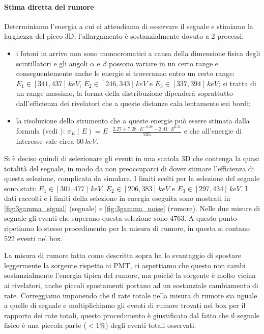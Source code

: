 \paragraph{Stima diretta del rumore}
Determiniamo l'energia a cui ci attendiamo di osservare il segnale e stimiamo la larghezza del picco 3D, l'allargamento è sostanzialmente dovuto a 2 processi:
\begin{itemize}
	\item i fotoni in arrivo non sono monocromatici a causa della dimensione fisica degli scintillatori e gli angoli $\alpha$ e $\beta$ possono variare in un certo range e conseguentemente anche le energie si troveranno entro un certo range:  $E_1 \in [341,437]\,\si{keV}$, $E_2 \in [246,343]\,\si{keV}$ e $E_3 \in [337,394]\,\si{keV}$; si tratta di un range massimo, la forma della distribuzione dipenderà soprattutto dall'efficienza dei rivelatori che a queste distanze cala lentamente sui bordi;
	\item la risoluzione dello strumento che a queste energie può essere stimata dalla formula (vedi \cite{3}):
	$\sigma_E(E) = E \cdot \frac{2.27 + 7.28 \cdot E ^ {-0.29} - 2.41 \cdot E ^ {0.21}} {235}$ e che all'energie di interesse vale circa $\SI{60}{keV}$.
\end{itemize}

Si è deciso quindi di selezionare gli eventi in una scatola 3D che contenga la quasi totalità del segnale, in modo da non preoccuparci di dover stimare l'efficienza di questa selezione, complicata da simulare. 
I limiti scelti per la selezione del segnale sono stati: $E_1 \in [301,477]\,\si{keV}$, $E_2 \in [206,383]\,\si{keV}$ e $E_3 \in [297,434]\,\si{keV}$.
I dati raccolti e i limiti della selezione in energia eseguita sono mostrati in \autoref{fig:3gamma_signal} (segnale) e \autoref{fig:3gamma_noise} (rumore).
Nelle due misure di segnale gli eventi che superano questa selezione sono 4763. 
A questo punto ripetiamo lo stesso procedimento per la misura di rumore, in questa si contano 522 eventi nel box.

La misura di rumore fatta come descritta sopra ha lo svantaggio di spostare leggermente la sorgente rispetto ai PMT, ci aspettiamo che questo non cambi sostanzialmente l'energia tipica del rumore, ma poiché la sorgente è molto vicina ai rivelatori, anche piccoli spostamenti portano ad un sostanziale cambiamento di rate. Correggiamo imponendo che il rate totale nella misura di rumore sia uguale a quelle di segnale e moltiplichiamo gli eventi di rumore trovati nel box per il rapporto dei rate totali, questo procedimento è giustificato dal fatto che il segnale fisico è una piccola parte ($< 1\%$) degli eventi totali osservati.

